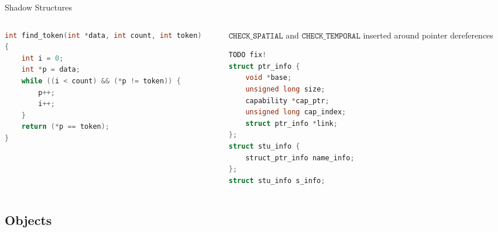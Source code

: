 \documentclass[aspectratio=169]{beamer}
\begin{document}

\begin{frame}[fragile]{Shadow Structures}
\begin{columns}
\begin{column}{0.48\textwidth}
\begin{lstlisting}[language=C,mathescape,basicstyle={\scriptsize\ttfamily}]
int find_token(int *data, int count, int token)
{
    int i = 0;
    int *p = data;
    while ((i < count) && (*p != token)) {
        p++;
        i++;
    }
    return (*p == token);
}
\end{lstlisting}
\end{column}

\pause

\begin{column}{0.48\textwidth}
\begin{itemize}
\footnotesize{
    \item $\texttt{CHECK\_SPATIAL}$ and $\texttt{CHECK\_TEMPORAL}$ inserted around pointer dereferences
}
\end{itemize}

\begin{lstlisting}[language=C,mathescape,basicstyle={\scriptsize\ttfamily}]
TODO fix!
struct ptr_info {
    void *base;
    unsigned long size;
    capability *cap_ptr;
    unsigned long cap_index;
    struct ptr_info *link;
};
struct stu_info {
    struct_ptr_info name_info;
};
struct stu_info s_info;
\end{lstlisting}
    \end{column}
  \end{columns}
\end{frame}


\subsection{Objects}
\end{document}
